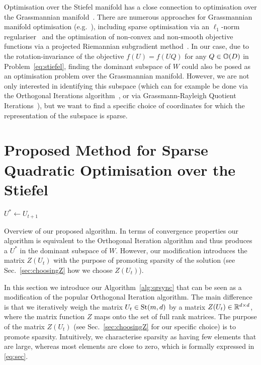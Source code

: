 \documentclass{article}
\begin{document}
%

Optimisation over the Stiefel manifold has a close connection to optimisation over the Grassmannian manifold~\cite{absil2009optimization}. There are numerous approaches for Grassmannian manifold optimisation  (e.g.~\cite{edelman1998geometry,de2004grassmann}), including sparse optimisation via an $\ell_1$-norm regulariser~\cite{wang2017grassmannian} and the optimisation of non-convex and non-smooth objective functions via a projected Riemannian subgradient method~\cite{zhu2019linearly}. In our case, due to the rotation-invariance of the objective $f(U) = f(UQ)$ for any $Q \in \mathbb{O}(D)$ in Problem~\eqref{eq:stiefel}, finding the dominant subspace of $W$ could also be posed as an optimisation problem over the Grassmannian manifold. However, we are not only interested in identifying this subspace (which can for example be done via the Orthogonal Iterations algorithm~\cite{golub2013matrix}, or via Grassmann-Rayleigh Quotient Iterations~\cite{absil2002grassmann}), but we want to find a specific choice of coordinates for which the representation of the subspace is sparse. 


\section{Proposed Method for Sparse Quadratic Optimisation over the Stiefel}
\begin{algorithm}\label{alg:qrsync}
\DontPrintSemicolon

%

    $U^* \gets U_{t+1}$
 \caption{Overview of our proposed algorithm. In terms of convergence properties our algorithm is equivalent to the Orthogonal Iteration algorithm and thus produces a $U^*$ in the dominant subspace of $W$. However, our modification introduces the matrix $Z(U_t)$ with the purpose of promoting sparsity of the solution (see Sec.~\ref{sec:choosingZ} how we choose $Z(U_t)$). }
\end{algorithm}
In this section we introduce our Algorithm~\ref{alg:qrsync} that can be seen as a modification of the popular Orthogonal Iteration algorithm. The main difference is that we iteratively weigh the matrix $U_t \in \operatorname{St}(m,d)$ by a matrix $Z(U_t) \in \mathbb{R}^{d \times d}$, where the matrix function $Z$ maps onto the set of full rank matrices.
%
%
%
%
The purpose of the matrix $Z(U_t)$ (see Sec.~\ref{sec:choosingZ} for our specific choice) is to promote sparsity.
%
Intuitively, we characterise sparsity as having few elements that are large, whereas most elements are close to zero, which is formally expressed in \eqref{eq:sec}.
\end{document}
